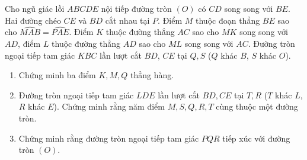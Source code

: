 \begin{ex}%
	Cho ngũ giác lồi $ABCDE$ nội tiếp đường tròn $(O)$ có $CD$ song song với $BE$. Hai đường chéo $CE$ và $BD$ cắt nhau tại $P$. Điểm $M$ thuộc đoạn thẳng $BE$ sao cho $\widehat{MAB}=\widehat{PAE}$. Điểm $K$ thuộc đường thẳng $AC$ sao cho $MK$ song song với $AD$, điểm $L$ thuộc đường thẳng $AD$ sao cho $ML$  song song với $AC$. Đường tròn ngoại tiếp tam giác $KBC$ lần lượt cắt $BD$, $CE$ tại $Q,S$ ($Q$ khác $B$, $S$ khác $O$).
	\begin{enumerate}
		\item Chứng minh ba điểm $K,M,Q$ thẳng hàng.
		\item Đường tròn ngoại tiếp tam giác $LDE$ lần lượt cắt $BD,CE$ tại $T,R$ ($T$ khác $L$, $R$ khác $E$). Chứng minh rằng năm điểm $M,S,Q,R,T$ cùng thuộc một đường tròn.
		\item Chứng minh rằng đường tròn ngoại tiếp tam giác $PQR$ tiếp xúc với đường tròn $(O)$.
		\end{enumerate}
\end{ex}
